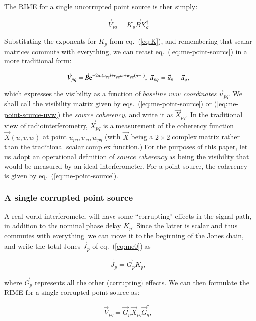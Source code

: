 \documentclass[]{aa}
\begin{document}
The RIME for a single uncorrupted point source is then simply:

  \begin{equation}\label{eq:me-point-source}
  \vec V_{pq} = K_p \vec B  K^\dagger_q
  \end{equation}

Substituting the exponents for $K_p$ from eq.~(\ref{eq:K}), and remembering that scalar matrices commute with everything, we can recast eq.~(\ref{eq:me-point-source}) in a more traditional form:

  \begin{equation}\label{eq:me-point-source-uvw}
  \vec V_{pq} = \vec B  {\rm e}^{-2\pi i(u_{pq} l+v_{pq} m+w_{pq} (n-1)},\;\vec u_{pq} = \vec u_p - \vec u_q,
  \end{equation}
 
which expresses the visibility as a function of {\em baseline $uvw$ coordinates} $\vec u_{pq}$. We shall call the visibility matrix given by eqs.~(\ref{eq:me-point-source}) or (\ref{eq:me-point-source-uvw}) the {\em source coherency}, and write it as $\vec X_{pq}$. In the traditional view of radiointerferometry, $\vec X_{pq}$ is a measurement of the coherency function $\vec X(u,v,w)$ at point $u_{pq},v_{pq},w_{pq}$ (with $\vec X$ being a $2\times2$ complex matrix rather than the traditional scalar complex function.) For the purposes of this paper, let us adopt an operational definition of {\em source coherency} as being the visibility that would be measured by an ideal interferometer. For a point source, the coherency is given by eq.~(\ref{eq:me-point-source}).

\subsubsection{A single corrupted point source}

A real-world interferometer will have some ``corrupting'' effects in the signal path, in addition to the nominal phase delay $K_p$. Since the latter is scalar and thus commutes with everything, we can move it to the beginning of the Jones chain, and write the total Jones $\vec J_p$ of eq.~(\ref{eq:me0}) as

\[
\vec J_p = \vec G_p K_p,
\]

where $\vec G_p$ represents all the other (corrupting) effects. We can then formulate the RIME for a single corrupted point source as:

  \begin{equation}\label{eq:me-point-source-corrupted}
  \vec V_{pq} = \vec G_p \vec X_{pq} \vec G^\dagger_q,
  \end{equation}
\end{document}
